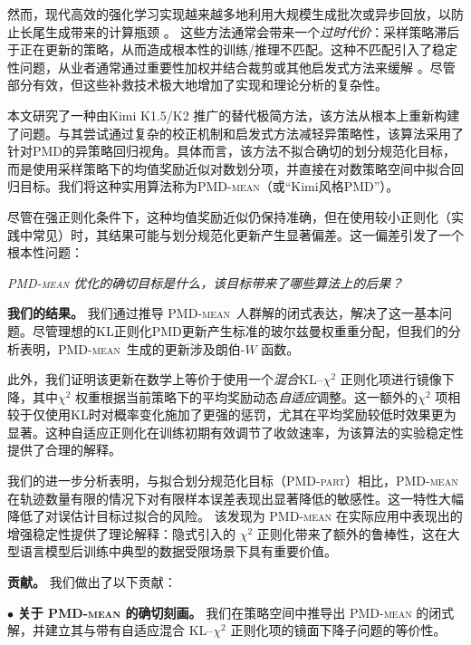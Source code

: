 \documentclass{article}
\theoremstyle{plain}
\theoremstyle{definition}
\theoremstyle{remark}
\begin{document}
然而，现代高效的强化学习实现越来越多地利用大规模生成批次或异步回放，以防止长尾生成带来的计算瓶颈 \citep{noukhovitch2024asynchronous,fu2025areal}。  
这些方法通常会带来一个\emph{过时代价}：采样策略滞后于正在更新的策略，从而造成根本性的训练/推理不匹配。这种不匹配引入了稳定性问题，从业者通常通过重要性加权并结合裁剪或其他启发式方法来缓解 \citep{yao2025offpolicy,liu-li-2025-rl-collapse}。尽管部分有效，但这些补救技术极大地增加了实现和理论分析的复杂性。

本文研究了一种由Kimi K1.5/K2 \citep{team2025kimik15,team2025kimik20}推广的替代极简方法，该方法从根本上重新构建了问题。与其尝试通过复杂的校正机制和启发式方法减轻异策略性，该算法采用了针对PMD的异策略回归视角。具体而言，该方法不拟合确切的划分规范化目标，而是使用采样策略下的均值奖励近似对数划分项，并直接在对数策略空间中拟合回归目标。我们将这种实用算法称为\textsc{PMD-mean}（或“Kimi风格PMD”）。

尽管在强正则化条件下，这种均值奖励近似仍保持准确，但在使用较小正则化（实践中常见）时，其结果可能与划分规范化更新产生显著偏差。这一偏差引发了一个根本性问题：

\begin{center}
\emph{\textsc{PMD-mean} 优化的确切目标是什么，该目标带来了哪些算法上的后果？}
\end{center}

\textbf{我们的结果。} 我们通过推导 \textsc{PMD-mean}\ 人群解的闭式表达，解决了这一基本问题。尽管理想的KL正则化PMD更新产生标准的玻尔兹曼权重重分配，但我们的分析表明，\textsc{PMD-mean}\ 生成的更新涉及朗伯-$W$  函数。

此外，我们证明该更新在数学上等价于使用一个\emph{混合}KL--$\chi^2$ 正则化项进行镜像下降，其中$\chi^2$ 权重根据当前策略下的平均奖励动态\emph{自适应}调整。这一额外的$\chi^2$ 项相较于仅使用KL时对概率变化施加了更强的惩罚，尤其在平均奖励较低时效果更为显著。这种自适应正则化在训练初期有效调节了收敛速率，为该算法的实验稳定性提供了合理的解释。

我们的进一步分析表明，与拟合划分规范化目标（\textsc{PMD-part}）相比，\textsc{PMD-mean} 在轨迹数量有限的情况下对有限样本误差表现出显著降低的敏感性。这一特性大幅降低了对误估计目标过拟合的风险。  
该发现为 \textsc{PMD-mean} 在实际应用中表现出的增强稳定性提供了理论解释：隐式引入的 $\chi^2$ 正则化带来了额外的鲁棒性，这在大型语言模型后训练中典型的数据受限场景下具有重要价值。

\textbf{贡献。}
我们做出了以下贡献：

$\bullet$  \textbf{关于 \textsc{PMD-mean} 的确切刻画。} 我们在策略空间中推导出 \textsc{PMD-mean} 的闭式解，并建立其与带有自适应混合 KL--$\chi^2$  正则化项的镜面下降子问题的等价性。
\end{document}
